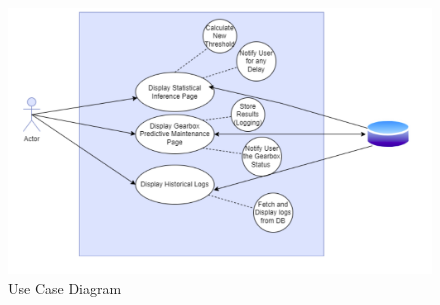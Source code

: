 \label{sec:use-case-dia}
\begin{figure}
	\centering
	\includegraphics[width=1.2\linewidth]{images/use-case-diagram.png}
	\caption{Use Case Diagram}
\end{figure} 